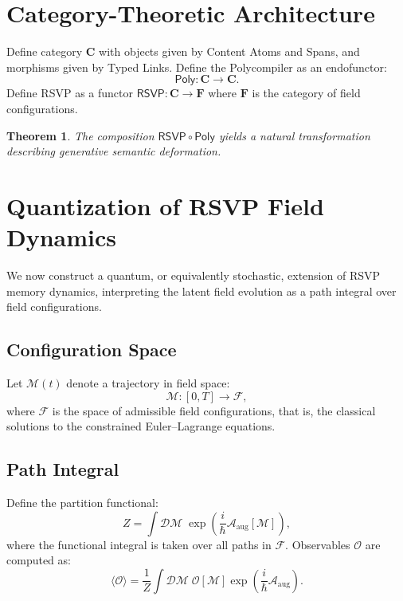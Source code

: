 \documentclass[11pt]{article}
\newtheorem{theorem}{Theorem}[section]
\begin{document}
\section{Category-Theoretic Architecture}
\label{sec:cat}

Define category $\mathbf{C}$ with objects given by Content Atoms and
Spans, and morphisms given by Typed Links.
Define the Polycompiler as an endofunctor:
\[
\mathsf{Poly}: \mathbf{C}\to\mathbf{C}.
\]
Define RSVP as a functor $\mathsf{RSVP}: \mathbf{C}\to\mathbf{F}$
where $\mathbf{F}$ is the category of field configurations.

\begin{theorem}
The composition $\mathsf{RSVP}\circ \mathsf{Poly}$ yields a natural
transformation describing generative semantic deformation.
\end{theorem}

\section{Quantization of RSVP Field Dynamics}

We now construct a quantum, or equivalently stochastic, extension of RSVP
memory dynamics, interpreting the latent field evolution as a path integral
over field configurations.

\subsection{Configuration Space}

Let $\mathcal{M}(t)$ denote a trajectory in field space:
\[
\mathcal{M} : [0,T] \to \mathcal{F},
\]
where $\mathcal{F}$ is the space of admissible field configurations, that is,
the classical solutions to the constrained Euler--Lagrange equations.

\subsection{Path Integral}

Define the partition functional:
\[
Z = \int \mathcal{D}\mathcal{M}\;
\exp\left(
\frac{i}{\hbar} \mathcal{A}_{\text{aug}}[\mathcal{M}]
\right),
\]
where the functional integral is taken over all paths in $\mathcal{F}$.
Observables $\mathcal{O}$ are computed as:
\[
\langle \mathcal{O} \rangle
=
\frac{1}{Z}
\int \mathcal{D}\mathcal{M}\;
\mathcal{O}[\mathcal{M}]
\exp\left(
\frac{i}{\hbar} \mathcal{A}_{\text{aug}}
\right).
\]
\end{document}
